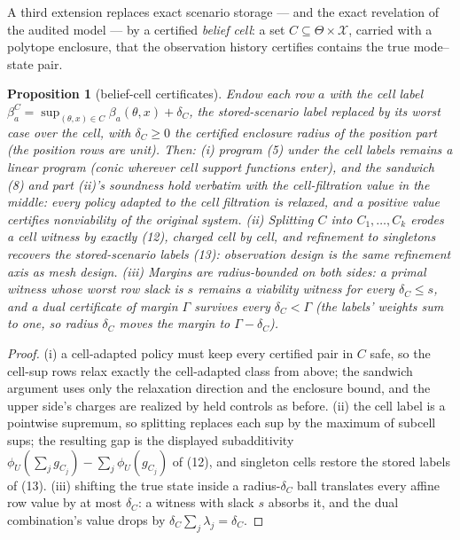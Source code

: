 \documentclass[10pt,twocolumn]{article}
\theoremstyle{plain}
\newtheorem{proposition}[theorem]{Proposition}
\theoremstyle{definition}
\theoremstyle{remark}
\begin{document}
A third extension replaces exact scenario storage --- and the exact
revelation of the audited model --- by a certified \emph{belief cell}: a
set \(C \subseteq \Theta \times \mathcal{X}\), carried with a polytope
enclosure, that the observation history certifies contains the true
mode--state pair.

\begin{proposition}[belief-cell certificates]\label{prop:beliefcells}
Endow each row \(a\) with the cell label
\(\beta_a^{C} = \sup_{(\theta,x) \in C} \beta_a(\theta,x) +
\delta_C\), the stored-scenario label replaced by its worst case over the
cell, with \(\delta_C \ge 0\) the certified enclosure radius of the
position part (the position rows are unit). Then:
\emph{(i)} program (5) under the cell labels remains a linear program
(conic wherever cell support functions enter), and the sandwich (8) and
part (ii)'s soundness hold verbatim with the cell-filtration value in the
middle: every policy adapted to the cell filtration is relaxed, and a
positive value certifies nonviability of the original system.
\emph{(ii)} Splitting \(C\) into \(C_1, \dots, C_k\) erodes a cell
witness by exactly (12), charged cell by cell, and refinement to singletons
recovers the stored-scenario labels (13): observation design is the same
refinement axis as mesh design. \emph{(iii)} Margins are radius-bounded on
both sides: a primal witness whose worst row slack is \(s\) remains a
viability witness for every \(\delta_C \le s\), and a dual certificate
of margin \(\Gamma\) survives every \(\delta_C < \Gamma\) (the
labels' weights sum to one, so radius \(\delta_C\) moves the margin to
\(\Gamma - \delta_C\)).
\end{proposition}

\begin{proof}
(i) a cell-adapted policy must keep every certified pair in \(C\) safe, so
the cell-sup rows relax exactly the cell-adapted class from above; the
sandwich argument uses only the relaxation direction and the enclosure
bound, and the upper side's charges are realized by held controls as before.
(ii) the cell label is a pointwise supremum, so splitting replaces each sup
by the maximum of subcell sups; the resulting gap is the displayed
subadditivity \(\phi_U(\sum_j g_{C_j}) - \sum_j \phi_U(g_{C_j})\) of
(12), and singleton cells restore the stored labels of (13). (iii) shifting
the true state inside a radius-\(\delta_C\) ball translates every affine
row value by at most \(\delta_C\): a witness with slack \(s\) absorbs
it, and the dual combination's value drops by \(\delta_C \sum_j
\lambda_j = \delta_C\).
\end{proof}
\end{document}
